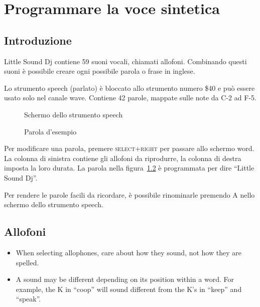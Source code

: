\chapter{Programmare la voce sintetica}
\label{speech-chapter}

\section{Introduzione}

Little Sound Dj contiene 59 suoni vocali, chiamati allofoni. Combinando questi suoni è possibile creare ogni possibile parola o frase in inglese.

Lo strumento speech (parlato) è bloccato allo strumento numero \$40 e può essere usato solo nel canale wave. Contiene 42 parole, mappate sulle note da C-2 ad F-5.

\begin{figure}[htpb]
	\begin{center}
	\end{center}
	\caption{Schermo dello strumento speech}
	\label{fig:speech}
\end{figure}
\begin{figure}[htpb]
	\begin{center}
	\end{center}
	\caption{Parola d'esempio}
	\label{fig:word}
\end{figure}

Per modificare una parola, premere \textsc{select+right} per passare allo schermo word. La colonna di sinistra contiene gli allofoni da riprodurre, la colonna di destra imposta la loro durata. La parola nella figura~\ref{fig:word} è programmata per dire ``Little Sound Dj''.

Per rendere le parole facili da ricordare, è possibile rinominarle premendo A nello schermo dello strumento speech.

\section{Allofoni}

\begin{itemize}
\item When selecting allophones, care about how they sound, not how they are spelled.
\item A sound may be different depending on its position within a word. For example, the K in ``coop'' will sound different from the K's in ``keep'' and ``speak''.
\end{itemize}

